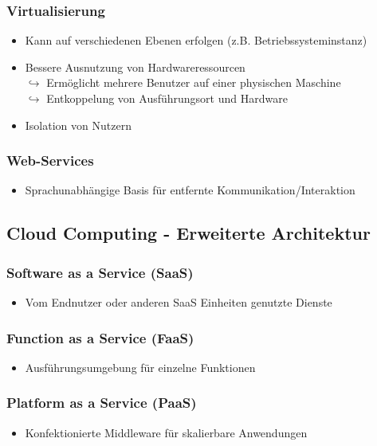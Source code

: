 \documentclass[a4paper,10pt]{scrreprt}
\begin{document}
	\subsubsection{Virtualisierung}
	\begin{itemize}
		\item Kann auf verschiedenen Ebenen erfolgen (z.B. Betriebssysteminstanz)
		\item Bessere Ausnutzung von Hardwareressourcen\\[5pt]
		$\hookrightarrow$ Ermöglicht mehrere Benutzer auf einer physischen Maschine\\[5pt]
		$\hookrightarrow$ Entkoppelung von Ausführungsort und Hardware 
		\item Isolation von Nutzern
	\end{itemize}
	\subsubsection{Web-Services}
	\begin{itemize}
		\item Sprachunabhängige Basis für entfernte Kommunikation/Interaktion
	\end{itemize}
	\subsection{Cloud Computing - Erweiterte Architektur}
	\subsubsection{Software as a Service (SaaS)}
	\begin{itemize}
		\item Vom Endnutzer oder anderen SaaS Einheiten genutzte Dienste
	\end{itemize}
	\subsubsection{Function as a Service (FaaS)}
	\begin{itemize}
		\item Ausführungsumgebung für einzelne Funktionen
	\end{itemize}
	\subsubsection{Platform as a Service (PaaS)}
	\begin{itemize}
		\item Konfektionierte Middleware für skalierbare Anwendungen
	\end{itemize}
\end{document}
